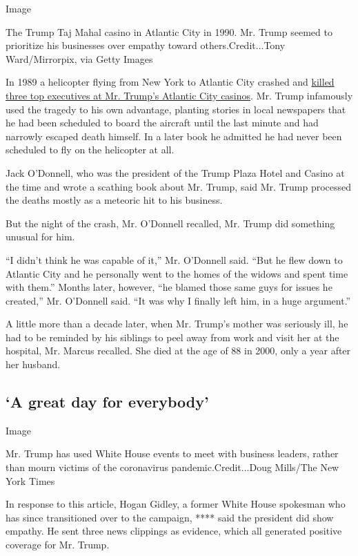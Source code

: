 Image

The Trump Taj Mahal casino in Atlantic City in 1990. Mr. Trump seemed to
prioritize his businesses over empathy toward others.Credit...Tony
Ward/Mirrorpix, via Getty Images

In 1989 a helicopter flying from New York to Atlantic City crashed and
\href{https://www.nytimes3xbfgragh.onion/1989/10/11/nyregion/copter-crash-kills-3-aides-of-trump.html}{killed
three top executives at Mr. Trump's Atlantic City casinos}. Mr. Trump
infamously used the tragedy to his own advantage, planting stories in
local newspapers that he had been scheduled to board the aircraft until
the last minute and had narrowly escaped death himself. In a later book
he admitted he had never been scheduled to fly on the helicopter at all.

Jack O'Donnell, who was the president of the Trump Plaza Hotel and
Casino at the time and wrote a scathing book about Mr. Trump, said Mr.
Trump processed the deaths mostly as a meteoric hit to his business.

But the night of the crash, Mr. O'Donnell recalled, Mr. Trump did
something unusual for him.

``I didn't think he was capable of it,'' Mr. O'Donnell said. ``But he
flew down to Atlantic City and he personally went to the homes of the
widows and spent time with them.'' Months later, however, ``he blamed
those same guys for issues he created,'' Mr. O'Donnell said. ``It was
why I finally left him, in a huge argument.''

A little more than a decade later, when Mr. Trump's mother was seriously
ill, he had to be reminded by his siblings to peel away from work and
visit her at the hospital, Mr. Marcus recalled. She died at the age of
88 in 2000, only a year after her husband.

\hypertarget{a-great-day-for-everybody}{%
\subsection{`A great day for
everybody'}\label{a-great-day-for-everybody}}

Image

Mr. Trump has used White House events to meet with business leaders,
rather than mourn victims of the coronavirus pandemic.Credit...Doug
Mills/The New York Times

In response to this article, Hogan Gidley, a former White House
spokesman who has since transitioned over to the campaign, **** said the
president did show empathy. He sent three news clippings as evidence,
which all generated positive coverage for Mr. Trump.

